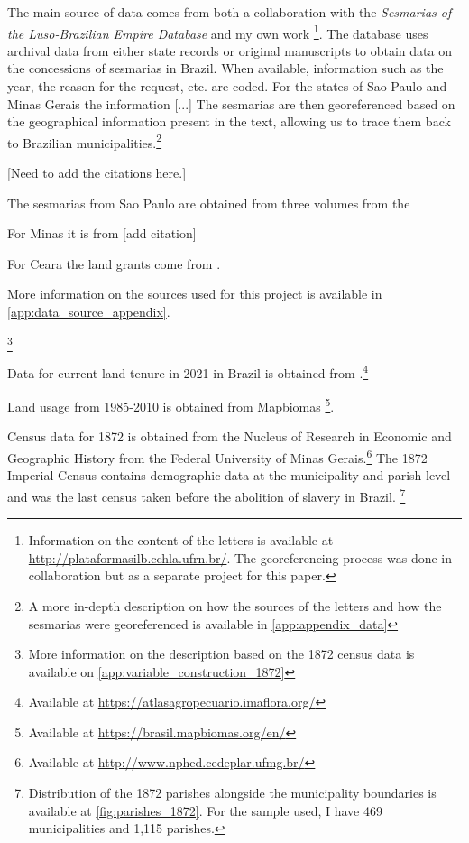 \documentclass{article}
\begin{document}
The main source of data comes from both a collaboration with the \textit{Sesmarias of the Luso-Brazilian Empire Database} and my own work \footnote{
  Information on the content of the letters is available at \url{http://plataformasilb.cchla.ufrn.br/}. The georeferencing process was done in collaboration but as a separate project for this paper.}.
The database uses archival data from either state records or original manuscripts to obtain data on the concessions of sesmarias in Brazil. 
When available, information such as the year, the reason for the request, etc. are coded. 
For the states of Sao Paulo and Minas Gerais the information [...]
The sesmarias are then georeferenced based on the geographical information present in the text, allowing us to trace them back to Brazilian municipalities.\footnote{A more in-depth description on how the sources of the letters and how the sesmarias were georeferenced is available in \autoref{app:appendix_data}}

[Need to add the citations here.]

The sesmarias from Sao Paulo are obtained from three volumes from the \textcite{noauthor_1921-qd}

For Minas it is from [add citation]

For Ceara the land grants come from \textcite{Pereira1971-cs}.

More information on the sources used for this project is available in \autoref{app:data_source_appendix}.

\footnote{More information on the description based on the 1872 census data is available on \autoref{app:variable_construction_1872}}

Data for current land tenure in 2021 in Brazil is obtained from \textcite{Sparovek2019-dn}.\footnote{
  Available at \url{https://atlasagropecuario.imaflora.org/}}

Land usage from 1985-2010 is obtained from Mapbiomas \parencite{Souza2020-kb}\footnote{
  Available at \url{https://brasil.mapbiomas.org/en/}}.

Census data for 1872 is obtained from the Nucleus of Research in Economic and Geographic History from the Federal University of Minas Gerais.\footnote{
  Available at \url{http://www.nphed.cedeplar.ufmg.br/}}
The 1872 Imperial Census contains demographic data at the municipality and parish level and was the last census taken before the abolition of slavery in Brazil. \footnote{Distribution of the 1872 parishes alongside the municipality boundaries is available at \autoref{fig:parishes_1872}. For the sample used, I have 469 municipalities and 1,115 parishes.}
\end{document}
